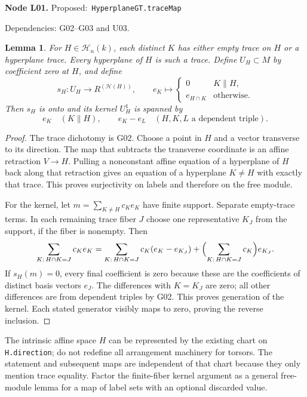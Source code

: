 \documentclass[11pt]{article}
\newtheorem{lemma}[theorem]{Lemma}
\theoremstyle{remark}\newtheorem{remark}[theorem]{Remark}
\newcommand{\cH}{\mathcal H}
\newcommand{\code}[1]{\nolinkurl{#1}}
\newcommand{\node}[3]{\par\Needspace{8\baselineskip}\smallskip\noindent\textbf{Node #1.}\quad
 \textsf{Proposed:}\ \code{#2}\par\noindent
 \textsf{Dependencies:} #3.\par\smallskip}
\begin{document}
\node{L01}{HyperplaneGT.traceMap}{G02--G03 and U03}
\begin{lemma}\label{lem:l01}
For $H\in\cH_n(k)$, each distinct $K$ has either empty trace on
$H$ or a hyperplane trace. Every hyperplane of $H$ is such a trace.
Define $U_H\subset M$ by coefficient zero at $H$, and define
\[
 s_H:U_H\longrightarrow R^{(\cH(H))},\qquad
 e_K\longmapsto
 \begin{cases}0&K\parallel H,\\ e_{H\cap K}&\text{otherwise}.
 \end{cases}
\]
Then $s_H$ is onto and its kernel $U_H^1$ is spanned by
\[
 e_K\quad(K\parallel H),\qquad
 e_K-e_L\quad(H,K,L\text{ a dependent triple}).
\]
\end{lemma}
\begin{proof}
The trace dichotomy is G02. Choose a point in $H$ and a vector
transverse to its direction. The map that subtracts the transverse
coordinate is an affine retraction $V\to H$. Pulling a nonconstant
affine equation of a hyperplane of $H$ back along that retraction
gives an equation of a hyperplane $K\ne H$ with exactly that trace.
This proves surjectivity on labels and therefore on the free module.

For the kernel, let $m=\sum_{K\ne H}c_Ke_K$ have finite support.
Separate empty-trace terms. In each remaining trace fiber $J$
choose one representative $K_J$ from the support, if the fiber is
nonempty. Then
\[
 \sum_{K:\,H\cap K=J}c_Ke_K
 =\sum_{K:\,H\cap K=J}c_K(e_K-e_{K_J})
   +\Bigl(\sum_{K:\,H\cap K=J}c_K\Bigr)e_{K_J}.
\]
If $s_H(m)=0$, every final coefficient is zero because these are
the coefficients of distinct basis vectors $e_J$. The differences
with $K=K_J$ are zero; all other differences are from dependent
triples by G02. This proves generation of the kernel. Each stated
generator visibly maps to zero, proving the reverse inclusion.
\end{proof}
The intrinsic affine space $H$ can be represented by the existing
chart on \code{H.direction}; do not redefine all arrangement
machinery for torsors. The statement and subsequent maps are
independent of that chart because they only mention trace equality.
Factor the finite-fiber kernel argument as a general free-module
lemma for a map of label sets with an optional discarded value.
\end{document}
